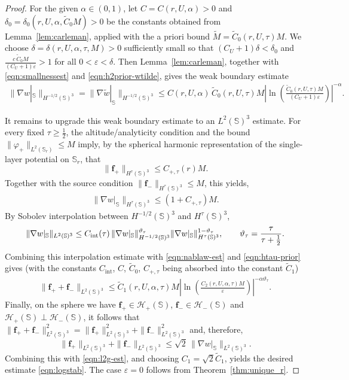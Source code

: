 \documentclass[a4paper, 11pt]{article}
\renewcommand{\SS}{\mathbb{S}}
\newcommand{\f}{\mathbf{f}}
\begin{document}
\begin{proof}
For the given $\alpha\in(0,1)$, let $C=C(r,U,\alpha)>0$ and $\delta_0=\delta_0(r,U,\alpha,\tilde{C}_{0}M)>0$ be the constants obtained from Lemma~\ref{lem:carleman}, applied with the a priori bound $\tilde{M}=\tilde{C}_{0}(r,U,\tau)M$. We choose $\delta=\delta(r,U,\alpha,\tau,M)>0$ sufficiently small so that $(C_U+1)\delta<\delta_0$ and $\frac{c\,\tilde{C}_{0}M}{(C_U+1)\varepsilon}>1$
for all $0<\varepsilon<\delta$. Then Lemma~\ref{lem:carleman}, together with \eqref{eqn:smallnessest} and \eqref{eqn:h2prior-wtilde}, gives the weak boundary estimate
	\begin{align}
		\|\nabla w|_\SS\|_{H^{-1/2}(\SS)^3}
		=\|\nabla\widetilde w|_\SS\|_{H^{-1/2}(\SS)^3}
		\le C(r,U,\alpha)\,\tilde{C}_{0}(r,U,\tau)M
		\left| \ln\left(\frac{\tilde{C}_{0}(r,U,\tau)M}{(C_U+1)\varepsilon}
		\right)
		\right|^{-\alpha}.\label{eqn:nablaw-est}
	\end{align}

 It remains to upgrade this weak boundary estimate to an $L^2(\SS)^3$ estimate. For every fixed $\tau\geq\frac12$, the altitude/analyticity condition and the bound $\|\varphi_+\|_{L^2(\SS_r)}\le M$ imply, by the spherical harmonic representation of the single-layer potential on $\SS_r$, that
\[
\|\f_+\|_{H^\tau(\SS)^3}\le C_{+,\tau}(r)M.
\]
Together with the source condition $\|\f_-\|_{H^\tau(\SS)^3}\le M$, this yields, 
\begin{align}
\|\nabla w|_\SS\|_{H^\tau(\SS)^3}
\le (1+C_{+,\tau})M.\label{eqn:htau-prior}
\end{align}
By Sobolev interpolation between $H^{-1/2}(\SS)^3$ and $H^\tau(\SS)^3$,
\[
\|\nabla w|_\SS\|_{L^2(\SS)^3}
\le C_{\rm int}(\tau)\,
\|\nabla w|_\SS\|_{H^{-1/2}(\SS)^3}^{\vartheta_\tau}
\|\nabla w|_\SS\|_{H^\tau(\SS)^3}^{1-\vartheta_\tau},
\qquad
\vartheta_\tau=\frac{\tau}{\tau+\frac12}.
\]
Combining this interpolation estimate with \eqref{eqn:nablaw-est} and \eqref{eqn:htau-prior} gives (with the constants $C_{\mathrm{int}}$, $C$, $\tilde{C}_0$, $C_{+,\tau}$ being absorbed into the constant $\tilde{C}_1$)
\begin{align}
\|\f_++\f_-\|_{L^2(\SS)^3}
\le \tilde{C}_1(r,U,\alpha,\tau)M
\left|\ln\left(\frac{C_2(r,U,\alpha,\tau)M}{\varepsilon}\right)\right|^{-\alpha\vartheta_\tau}.\label{eqn:l2g-est}
\end{align}
	Finally, on the sphere we have $\f_+\in \mathcal H_+(\SS)$, $\f_-\in \mathcal H_-(\SS)$ and $\mathcal H_+(\SS)\perp \mathcal H_-(\SS)$, it follows that $\|\f_++\f_-\|_{L^2(\SS)^3}^2=\|\f_+\|_{L^2(\SS)^3}^2+\|\f_-\|_{L^2(\SS)^3}^2$ and, therefore,
	\[
		\|\f_+\|_{L^2(\SS)^3}+\|\f_-\|_{L^2(\SS)^3}
		\le \sqrt{2}\,\|\nabla w|_\SS\|_{L^2(\SS)^3}.
	\]
	Combining this with \eqref{eqn:l2g-est}, and choosing $C_1=\sqrt{2}\tilde{C}_1$, yields the desired estimate \eqref{eqn:logstab}. The case $\varepsilon=0$ follows from Theorem~\ref{thm:unique_r}.
    
\end{proof}
\end{document}
